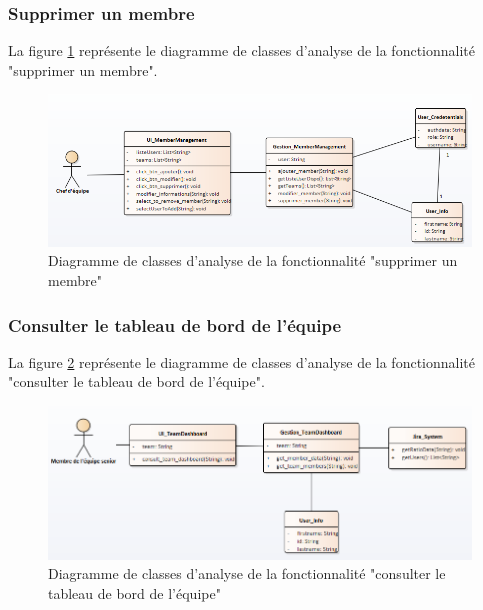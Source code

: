 \subsubsection{Supprimer un membre}
La figure \ref{code67} représente le diagramme de classes d'analyse de la fonctionnalité "supprimer un membre".
\begin{figure}[H]
  \centering
 \includegraphics[scale=0.69]{figures/diagrams/class/deletemember_class_diag.png}
 \caption{Diagramme de classes d'analyse de la fonctionnalité "supprimer un membre"}
 \label{code67}
\end{figure}

\subsubsection{Consulter le tableau de bord de l'équipe}
La figure \ref{code68} représente le diagramme de classes d'analyse de la fonctionnalité "consulter le tableau de bord de l'équipe".
\begin{figure}[H]
  \centering
 \includegraphics[scale=0.69]{figures/diagrams/class/teamdashboard_class_diag.png}
 \caption{Diagramme de classes d'analyse de la fonctionnalité "consulter le tableau de bord de l'équipe"}
 \label{code68}
\end{figure}

